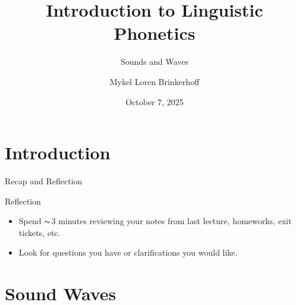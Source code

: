 \documentclass[professionalfonts]{beamer}
\title[LING 450/550] %
{Introduction to Linguistic Phonetics}
\subtitle{Sounds and Waves}
\author[Brinkerhoff] %
{Mykel Loren Brinkerhoff}
\institute[UW] %
{University of Washington}
\date[2025-10-07] %
{October 7, 2025}
\begin{document}
\begin{frame}
    \titlepage
\end{frame}

\section{Introduction}

    

\begin{frame}{Recap and Reflection}
    \begin{block}{Reflection}
        \begin{itemize}
            \item Spend $\thicksim$3 minutes reviewing your notes from last lecture, homeworks, exit tickets, etc.
            \item Look for questions you have or clarifications you would like. 
        \end{itemize}
    \end{block}
\end{frame}

\section{Sound Waves}

\end{document}
